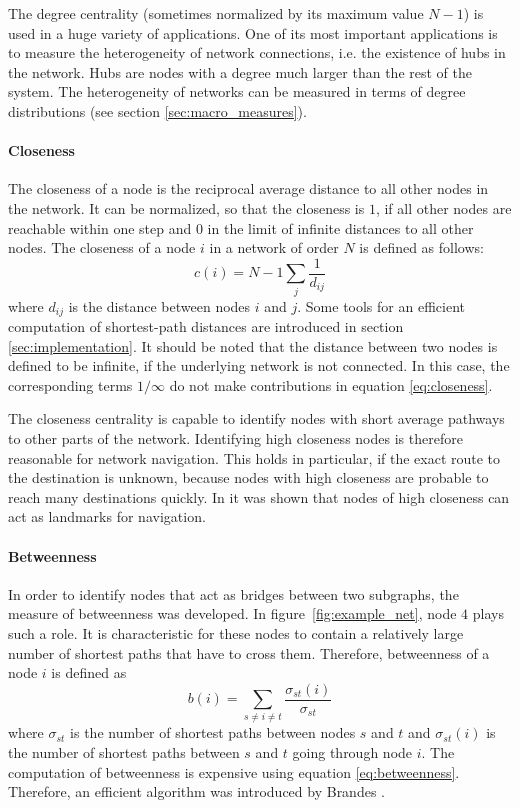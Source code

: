 The degree centrality (sometimes normalized by its maximum value $N-1$) is used in a huge variety of applications.
One of its most important applications is to measure the heterogeneity of network connections, i.e. the existence of hubs in the network.
Hubs are nodes with a degree much larger than the rest of the system.
The heterogeneity of networks can be measured in terms of degree distributions (see section \ref{sec:macro_measures}).

\paragraph{Closeness\color{Cayenne}{.}} 
The closeness of a node is the reciprocal average distance to all other nodes in the network.
It can be normalized, so that the closeness is $1$, if all other nodes are reachable within one step and $0$ in the limit of infinite distances to all other nodes.
The closeness of a node $i$ in a network of order $N$ is defined as follows:
\begin{equation}\label{eq:closeness}
c(i)=N-1 \sum _j \frac{1}{ d_{ij}}
\end{equation}
where $d_{ij}$ is the distance between nodes $i$ and $j$.
Some tools for an efficient computation of shortest-path distances are introduced in section \ref{sec:implementation}.
It should be noted that the distance between two nodes is defined to be infinite, if the underlying network is not connected.
In this case, the corresponding terms $1/\infty $ do not make contributions in equation \eqref{eq:closeness}.

The closeness centrality is capable to identify nodes with short average pathways to other parts of the network.
Identifying high closeness nodes is therefore reasonable for network navigation.
This holds in particular, if the exact route to the destination is unknown, because nodes with high closeness are probable to reach many destinations quickly.
In \citep{Zweig:closeness} it was shown that nodes of high closeness can act as landmarks for navigation.


\paragraph{Betweenness\color{Cayenne}{.}}
In order to identify nodes that act as bridges between two subgraphs, the measure of betweenness was developed.
In figure~\ref{fig:example_net}, node $4$ plays such a role.
It is characteristic for these nodes to contain a relatively large number of shortest paths that have to cross them.
Therefore, betweenness of a node $i$ is defined as
\begin{equation}\label{eq:betweenness}
b(i)=\sum _{s\neq i \neq t} \frac{\sigma _{st}(i)}{\sigma _{st}}
\end{equation}
where $\sigma _{st}$ is the number of shortest paths between nodes $s$ and $t$ and $\sigma _{st} (i)$ is the number of shortest paths between $s$ and $t$ going through node $i$.
The computation of betweenness is expensive using equation \eqref{eq:betweenness}.
Therefore, an efficient algorithm was introduced by Brandes \citep{Brandes:2001p2757}.

